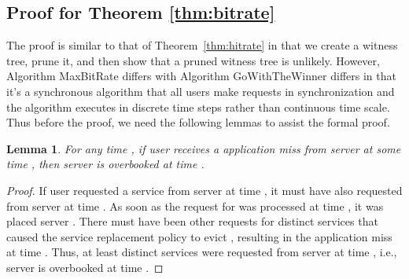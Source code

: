 \documentclass[conference]{IEEEtran}
\newtheorem{lemma}[theorem]{Lemma}
\begin{document}
\subsection{Proof for Theorem \ref{thm:bitrate}}


The proof is similar to that of Theorem~\ref{thm:hitrate} in that we create a witness tree, prune  it, and then show that a pruned witness tree is unlikely. However, Algorithm MaxBitRate differs with Algorithm GoWithTheWinner differs in that it's a synchronous algorithm that all users make requests in synchronization and the algorithm executes in discrete time steps rather than continuous time scale. Thus before the proof, we need the following lemmas to assist the formal proof.

\begin{lemma}
\label{lem:cachemiss}
For any time , if user  receives a application miss from server  at some time ,  then server  is overbooked at time .
\end{lemma}
\begin{proof}
If user  requested a service  from server  at time , it must have also requested  from server  at time .  As soon as the request  for  was processed at time , it was placed server . There must have been  other requests for distinct services that caused the service replacement policy to evict ,  resulting in the application miss at time . Thus, at least  distinct services were requested from server  at time , i.e., server  is overbooked at time .
\end{proof}
\end{document}
